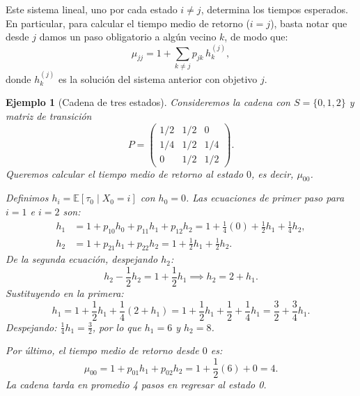 \documentclass[12pt]{book}
\newtheorem{example}{Ejemplo}[chapter]
\begin{document}
Este sistema lineal, uno por cada estado $i \neq j$, determina los tiempos esperados. En particular, para calcular el tiempo medio de retorno ($i = j$), basta notar que desde $j$ damos un paso obligatorio a algún vecino $k$, de modo que:
\[
\mu_{jj} = 1 + \sum_{k \neq j} p_{jk}\, h_k^{(j)},
\]
donde $h_k^{(j)}$ es la solución del sistema anterior con objetivo $j$.

\begin{example}[Cadena de tres estados]
Consideremos la cadena con $S = \{0, 1, 2\}$ y matriz de transición
\[
P = \begin{pmatrix}
1/2 & 1/2 & 0 \\
1/4 & 1/2 & 1/4 \\
0   & 1/2 & 1/2
\end{pmatrix}.
\]
Queremos calcular el tiempo medio de retorno al estado $0$, es decir, $\mu_{00}$.

Definimos $h_i = \mathbb{E}[\tau_0 \mid X_0 = i]$ con $h_0 = 0$. Las ecuaciones de primer paso para $i = 1$ e $i = 2$ son:
\begin{align*}
h_1 &= 1 + p_{10} h_0 + p_{11} h_1 + p_{12} h_2 = 1 + \frac{1}{4}(0) + \frac{1}{2} h_1 + \frac{1}{4} h_2, \\
h_2 &= 1 + p_{21} h_1 + p_{22} h_2 = 1 + \frac{1}{2} h_1 + \frac{1}{2} h_2.
\end{align*}
De la segunda ecuación, despejando $h_2$:
\[
h_2 - \frac{1}{2} h_2 = 1 + \frac{1}{2} h_1 \implies h_2 = 2 + h_1.
\]
Sustituyendo en la primera:
\[
h_1 = 1 + \frac{1}{2} h_1 + \frac{1}{4}(2 + h_1) = 1 + \frac{1}{2} h_1 + \frac{1}{2} + \frac{1}{4} h_1 = \frac{3}{2} + \frac{3}{4} h_1.
\]
Despejando: $\frac{1}{4} h_1 = \frac{3}{2}$, por lo que $h_1 = 6$ y $h_2 = 8$.

Por último, el tiempo medio de retorno desde $0$ es:
\[
\mu_{00} = 1 + p_{01} h_1 + p_{02} h_2 = 1 + \frac{1}{2}(6) + 0 = 4.
\]
La cadena tarda en promedio 4 pasos en regresar al estado 0.
\end{example}
\end{document}
